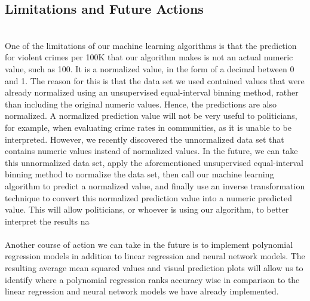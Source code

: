 \documentclass[letterpaper, 11 pt, conference]{article}
\begin{document}
\subsection{Limitations and Future Actions}
\\One of the limitations of our machine learning algorithms is that the prediction for violent crimes per 100K that our algorithm makes is not an actual numeric value, such as 100. It is a normalized value, in the form of a decimal between 0 and 1. The reason for this is that the data set we used contained values that were already normalized using an unsupervised equal-interval binning method, rather than including the original numeric values. Hence, the predictions are also normalized. A normalized prediction value will not be very useful to politicians, for example, when evaluating crime rates in communities, as it is unable to be interpreted. However, we recently discovered the unnormalized data set that contains numeric values instead of normalized values. In the future, we can take this unnormalized data set, apply the aforementioned unsupervised equal-interval binning method to normalize the data set, then call our machine learning algorithm to predict a normalized value, and finally use an inverse transformation technique to convert this normalized prediction value into a numeric predicted value. This will allow politicians, or whoever is using our algorithm, to better interpret the results na
\\
\\Another course of action we can take in the future is to implement polynomial regression models in addition to linear regression and neural network models. The resulting average mean squared values and visual prediction plots will allow us to identify where a polynomial regression ranks accuracy wise in comparison to the linear regression and neural network models we have already implemented.
\end{document}
